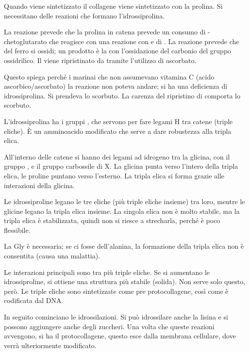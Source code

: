 
Quando viene sintetizzato il collagene viene
sintetizzato con la prolina. Si necessitano delle reazioni che formano
l'idrossiprolina.


La reazione prevede che la prolina in catena prevede un consumo di
\alpha-chetoglutarato che reagisce con una reazione con  e di . La reazione
prevede che del ferro si ossidi; un prodotto è la  con l'ossidazione
del carbonio del gruppo ossidrilico. Il  viene ripristinato da  tramite l'utilizzo di
ascorbato.


Questo spiega perché i marinai che non assumevano vitamina C (acido
ascorbico/ascorbato) la reazione non poteva andare; si ha una deficienza di
idrossiprolina. Si prendeva lo scorbuto. La carenza del ripristino di
 comporta lo scorbuto.

L'idrossiprolina ha i gruppi , che servono per fare legami H tra
catene (triple eliche). È un amminoacido modificato che serve a dare
robustezza alla tripla elica.

All'interno delle catene si hanno dei legami ad idrogeno tra la glicina, con il gruppo , e il gruppo carbossile di X. La glicina punta verso l'intero della tripla elica, le proline
puntano verso l'esterno. La tripla elica si forma grazie alle
interazioni della glicina.

Le idrossiproline legano le tre eliche (più triple eliche insieme) tra
loro, mentre le glicine legano la tripla elica insieme.
La singola elica non è molto stabile, ma la tripla elica è stabilizzata, quindi non si riesce a strecharla, perché è poco flessibile.

La Gly è necessaria; se ci fosse dell'alanina, la formazione della
tripla elica non è consentita (causa una malattia).

Le interazioni principali sono tra più triple eliche. Se si aumentano le
idrossiproline, si ottiene una struttura più stabile (solida). Non serve
solo questo, però.
Le triple eliche sono sintetizzate come pre protocollagene, così come è
codificata dal DNA.

In seguito cominciano le idrossilazioni. Si può idrossilare anche la
lisina e si possono aggiungere anche degli zuccheri.
Una volta che queste reazioni avvengono, si ha il protocollagene, questo
esce dalla membrana cellulare, dove verrà ulteriormente modificato.

